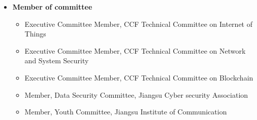 \documentclass{article}
\newcommand{\heading}[2][\relax]{\textbf{#2}\hfill#1\par\nobreak}
\begin{document}
\begin{justifying}
\begin{itemize}
    \item \heading[]{Member of committee}
    \begin{itemize}
    \item Executive Committee Member, CCF Technical Committee on Internet of Things
    \item Executive Committee Member, CCF Technical Committee on Network and System Security
    \item Executive Committee Member, CCF Technical Committee on Blockchain
    \item Member, Data Security Committee, Jiangsu Cyber security Association
    \item Member, Youth Committee, Jiangsu Institute of Communication
    \end{itemize}
    
    \end{itemize}
\end{justifying}
\end{document}
